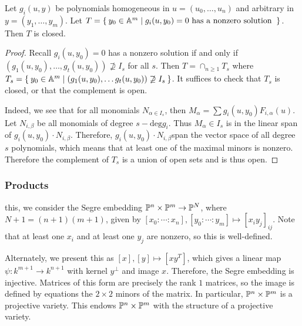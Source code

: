 \documentclass[twoside, 10pt]{article}
\begin{document}
    \begin{thm} Let $g_i(u,y)$ be
        polynomials homogeneous in $u = (u_0, \ldots, u_n)$ and arbitrary in $y
        = (y_1, \ldots, y_m)$. Let $T = \Set{y_0 \in \A^m | g_i(u,y_0)=0 \text{
        has a nonzero solution }}$. Then $T$ is closed.  \begin{proof} Recall
            $g_i(u, y_0)=0$ has a nonzero solution if and only if $(g_1(u,y_0),
            \ldots, g_t(u,y_0)) \not \supseteq I_s$ for all $s$.  Then $T =
            \cap_{n \geq 1} T_s$ where $T_s = \Set{y_0 \in \A^m | (g_1(u,y_0),
            \ldots g_t(u,y_0)) \not\supseteq I_s}$. It suffices to check that
            $T_s$ is closed, or that the complement is open.

            Indeed, we see that for all monomials $N_{\alpha \in I_s}$, then
            $M_{\alpha} = \sum g_i(u,y_0)F_{i,\alpha}(u)$. Let $N_{i,\beta}$ be
            all monomials of degree $s - \mathrm{deg}g_i$. Thus $M_{\alpha}\in
            I_s$ is in the linear span of $g_i(u,y_0) \cdot N_{i,\beta}$.
            Therefore, $g_i(u,y_0) \cdot N_{i,\beta}$span the vector space of
            all degree $s$ polynomials, which means that at least one of the
            maximal minors is nonzero. Therefore the complement of $T_s$ is a
        union of open sets and is thus open.  \end{proof} \end{thm}

    \subsubsection{Products}%
    this, we consider the Segre embedding $\P^n \times \P^m \to \P^N$, where
    $N+1 = (n+1)(m+1)$, given by $[x_0:\cdots:x_n], [y_0:\cdots:y_m] \mapsto
    [x_iy_j]_{ij}$. Note that at least one $x_i$ and at least one $y_j$ are
    nonzero, so this is well-defined.

    Alternately, we present this as $[x],[y] \mapsto [xy^T]$, which gives a
    linear map $\psi:k^{m+1} \to k^{n+1}$ with kernel $y^{\perp}$ and image
    $x$. Therefore, the Segre embedding is injective. Matrices of this form are
    precisely the rank $1$ matrices, so the image is defined by equations the
    $2 \times 2$ minors of the matrix. In particular, $\P^n \times \P^m$ is a
    projective variety. This endows $\P^n \times \P^m$ with the structure of a
    projective variety.
\end{document}

